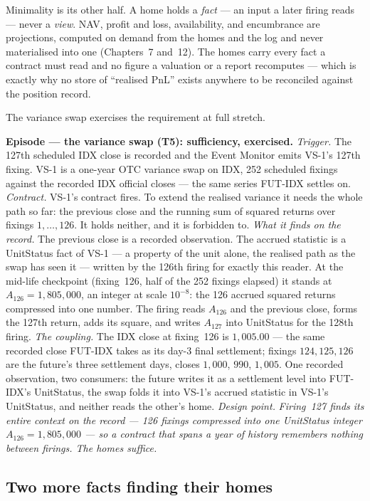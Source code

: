 Minimality is its other half. A home holds a \emph{fact} --- an input a later firing reads
--- never a \emph{view}. NAV, profit and loss, availability, and encumbrance are
projections, computed on demand from the homes and the log and never materialised into one
(Chapters~7 and~12). The homes carry every fact a contract
must read and no figure a valuation or a report recomputes --- which is exactly why no
store of ``realised PnL'' exists anywhere to be reconciled against the position record.

The variance swap exercises the requirement at full stretch.

\medskip\noindent\textbf{Episode --- the variance swap (T5): sufficiency, exercised.}
\emph{Trigger.} The 127th scheduled IDX close is recorded and the Event Monitor emits
VS-1's 127th fixing. VS-1 is a one-year OTC variance swap on IDX, 252 scheduled fixings
against the recorded IDX official closes --- the same series FUT-IDX settles on.
\emph{Contract.} VS-1's contract fires. To extend the realised variance it needs the whole
path so far: the previous close and the running sum of squared returns over fixings
$1,\dots,126$. It holds neither, and it is forbidden to.
\emph{What it finds on the record.} The previous close is a recorded observation. The
accrued statistic is a UnitStatus fact of VS-1 --- a property of the unit alone, the
realised path as the swap has seen it --- written by the 126th firing for exactly this
reader. At the mid-life checkpoint (fixing~126, half of the 252 fixings elapsed) it stands
at $A_{126}=1{,}805{,}000$, an integer at scale $10^{-8}$: the 126 accrued squared returns
compressed into one number. The firing reads $A_{126}$ and the previous close, forms the
127th return, adds its square, and writes $A_{127}$ into UnitStatus for the 128th firing.
\emph{The coupling.} The IDX close at fixing~126 is $1{,}005.00$ --- the same recorded
close FUT-IDX takes as its day-3 final settlement; fixings $124,125,126$ are the future's
three settlement days, closes $1{,}000$, $990$, $1{,}005$. One recorded observation, two
consumers: the future writes it as a settlement level into FUT-IDX's UnitStatus, the swap
folds it into VS-1's accrued statistic in VS-1's UnitStatus, and neither reads the other's
home.
\emph{Design point.} \emph{Firing~127 finds its entire context on the record --- 126
fixings compressed into one UnitStatus integer $A_{126}=1{,}805{,}000$ --- so a contract
that spans a year of history remembers nothing between firings. The homes suffice.}

\subsection{Two more facts finding their homes}

